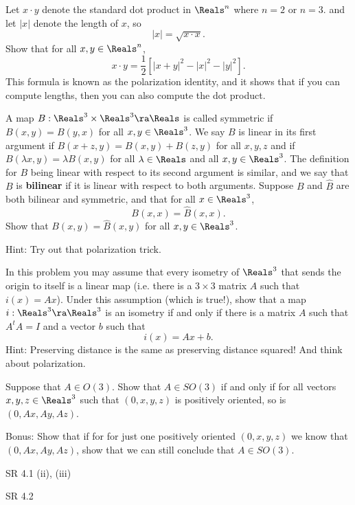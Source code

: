 \documentclass[minion]{homework}
\begin{document}
\begin{aproblems}

Let $x\cdot y$ denote the standard dot product in $\Reals^n$ where $n=2$ or $n=3$.
and let $|x|$ denote the length of $x$, so
\begin{equation}
|x| = \sqrt{x\cdot x}.
\end{equation}
Show that for all $x,y\in \Reals^n$,
\begin{equation}
x\cdot y = \frac{1}{2}\left[ |x+y|^2-|x|^2 - |y|^2\right].
\end{equation}
This formula is known as the polarization identity, and it shows that if you
can compute lengths, then you can also compute the dot product.

A map $B:\Reals^3\times \Reals^3\ra \Reals$ is called symmetric
if $B(x,y)=B(y,x)$ for all $x,y\in \Reals^3$.  We say $B$ is linear in its
first argument if $B(x+z,y)=B(x,y)+B(z,y)$ for all $x,y,z$ and if $B(\lambda x,y)=\lambda B(x,y)$
for all $\lambda\in\Reals$ and all $x,y\in \Reals^3$.  The definition for $B$ 
being linear with respect to its second argument is similar, and we say
that $B$ is \textbf{bilinear} if it is linear with respect to both arguments.
Suppose $B$ and $\hat B$ are both bilinear and symmetric, and that for all $x\in \Reals^3$,
\begin{equation}
B(x,x) = \hat B(x,x).
\end{equation}
Show that $B(x,y)=\hat B(x,y)$ for all $x,y\in\Reals^3$.

Hint: Try out that polarization trick.

\hproblem  In this problem you may assume that every isometry of $\Reals^3$ that
sends the origin to itself is a linear map (i.e. there is a $3\times 3$
matrix $A$ such that $i(x)= Ax$).  Under this assumption (which is true!), show 
that a map $i:\Reals^3\ra \Reals^3$ is an isometry if and only if there is a matrix
$A$ such that $A^t A=I$ and a vector $b$ such that
\begin{equation}
i(x) = Ax + b.
\end{equation}
Hint: Preserving distance is the same as preserving distance squared!  
And think about polarization.

\hproblem Suppose that $A\in O(3)$.  Show that $A\in SO(3)$ if and only if
for all vectors $x,y,z\in \Reals^3$ such that $(0,x,y,z)$ is positively oriented,
so is $(0,Ax, Ay, Az)$.

Bonus:  Show that if for for just one positively oriented $(0,x,y,z)$ we know that
$(0, Ax, Ay, Az)$, show that we can still conclude that $A\in SO(3)$.

\hproblem SR 4.1 (ii), (iii)

\hproblem SR 4.2

\end{aproblems}
\end{document}
